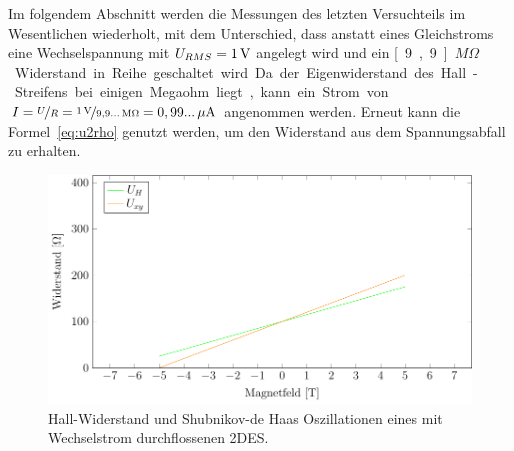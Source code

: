 
Im folgendem Abschnitt werden die Messungen des letzten Versuchteils im Wesentlichen wiederholt, mit dem Unterschied, dass anstatt eines Gleichstroms eine Wechselspannung %
 mit $U_{RMS}=\unit[1]{V}$ angelegt wird und ein \unit[9,9...]{$M\Omega$} Widerstand in Reihe geschaltet wird. Da der Eigenwiderstand des Hall-Streifens bei einigen Megaohm liegt, kann ein Strom von $I=\nicefrac{U}{R}=\nicefrac{\unit[1]{V}}{\unit[9,9...]{M\Omega}}=\unit[0,99...]{\mu A}$ angenommen werden. Erneut kann die Formel~\eqref{eq:u2rho} genutzt werden, um den Widerstand aus dem Spannungsabfall zu erhalten.


\begin{figure}[h]
	\centering
	\includegraphics{graphs/ac/full_range.pdf}
	\caption[Gleichstrommessung im maximalen Magnetfeldbereich]{
		Hall-Widerstand und Shubnikov-de Haas Oszillationen eines mit Wechselstrom durchflossenen 2DES.
	}
	\label{fig:full_range_ac}
\end{figure}